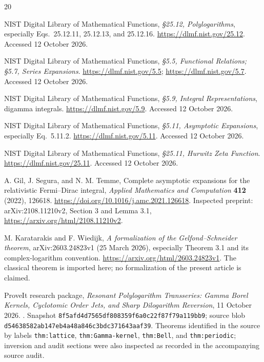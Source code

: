 \documentclass[11pt,a4paper]{article}
\numberwithin{equation}{section}
\theoremstyle{definition}\newtheorem{definition}[theorem]{Definition}
\theoremstyle{remark}\newtheorem{remark}[theorem]{Remark}
\newcommand{\snap}{\texttt{8f5afd4d7565df808359f6a0c22f87f79a119bb9}}
\begin{document}
\begin{thebibliography}{20}
\small\raggedright
{}
NIST Digital Library of Mathematical Functions,
\emph{\S25.12, Polylogarithms}, especially Eqs.~25.12.11,
25.12.13, and 25.12.16.
\url{https://dlmf.nist.gov/25.12}. Accessed 12 October 2026.

NIST Digital Library of Mathematical Functions,
\emph{\S5.5, Functional Relations; \S5.7, Series Expansions}.
\url{https://dlmf.nist.gov/5.5}; \url{https://dlmf.nist.gov/5.7}.
Accessed 12 October 2026.

NIST Digital Library of Mathematical Functions,
\emph{\S5.9, Integral Representations}, digamma integrals.
\url{https://dlmf.nist.gov/5.9}. Accessed 12 October 2026.

NIST Digital Library of Mathematical Functions,
\emph{\S5.11, Asymptotic Expansions}, especially Eq.~5.11.2.
\url{https://dlmf.nist.gov/5.11}. Accessed 12 October 2026.

NIST Digital Library of Mathematical Functions,
\emph{\S25.11, Hurwitz Zeta Function}.
\url{https://dlmf.nist.gov/25.11}. Accessed 12 October 2026.

A. Gil, J. Segura, and N. M. Temme,
Complete asymptotic expansions for the relativistic Fermi--Dirac integral,
\emph{Applied Mathematics and Computation} \textbf{412} (2022), 126618.
\url{https://doi.org/10.1016/j.amc.2021.126618}.
Inspected preprint: arXiv:2108.11210v2, Section 3 and Lemma 3.1,
\url{https://arxiv.org/html/2108.11210v2}.

M. Karatarakis and F. Wiedijk,
\emph{A formalization of the Gelfond--Schneider theorem},
arXiv:2603.24823v1 (25 March 2026), especially Theorem 3.1 and its
complex-logarithm convention.
\url{https://arxiv.org/html/2603.24823v1}.
The classical theorem is imported here; no formalization of the present
article is claimed.

ProveIt research package,
\emph{Resonant Polylogarithm Transseries: Gamma Borel Kernels,
Cyclotomic Order Jets, and Sharp Dilogarithm Reversion},
11 October 2026.
.
Snapshot \snap; source blob
\texttt{d54638582ab147eb4a48a846c3bdc371643aaf39}.
Theorems identified in the source by labels
\texttt{thm:lattice}, \texttt{thm:Gamma-kernel}, \texttt{thm:Bell},
and \texttt{thm:periodic}; inversion and audit sections were also inspected
as recorded in the accompanying source audit.


\end{thebibliography}
\end{document}
